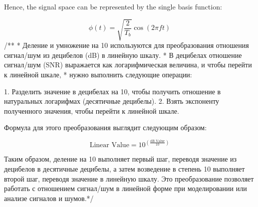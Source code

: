 \documentclass[14pt, a4paper]{extarticle}
\begin{document}
Hence, the signal space can be represented by the single basis function:

\[
\phi(t) = \sqrt{\frac{2}{T_{b}}} \cos\left(2\pi ft\right)
\]
\newpage
/**
 * Деление и умножение на 10 используются для преобразования отношения сигнал/шум из децибелов (dB) в линейную шкалу.
 * В децибелах отношение сигнал/шум (SNR) выражается как логарифмическая величина, и чтобы перейти к линейной шкале,
 * нужно выполнить следующие операции:

1. Разделить значение в децибелах на 10, чтобы получить отношение в натуральных логарифмах (десятичные децибелы).
2. Взять экспоненту полученного значения, чтобы перейти к линейной шкале.

Формула для этого преобразования выглядит следующим образом:

\[ \text{Linear Value} = 10^{\left(\frac{\text{dB Value}}{10}\right)} \]

Таким образом, деление на 10 выполняет первый шаг, переводя значение из децибелов в десятичные децибелы,
 а затем возведение в степень 10 выполняет второй шаг, переводя значение в линейную шкалу.
 Это преобразование позволяет работать с отношением сигнал/шум в линейной форме при моделировании или анализе сигналов и шумов.*/


  
\end{document}
